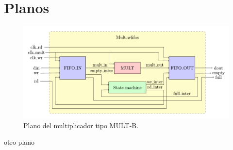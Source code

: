 
\chapter{Planos} %

\label{Planos} 

\begin{figure}[h!]
    \vspace*{4cm}
    \centering
    \includegraphics[width=15cm]{Figuras/mult_wfifos.pdf}
    \caption{Plano del multiplicador tipo MULT-B.}
    \label{fig:mult-b}
\end{figure}

\newpage

otro plano

